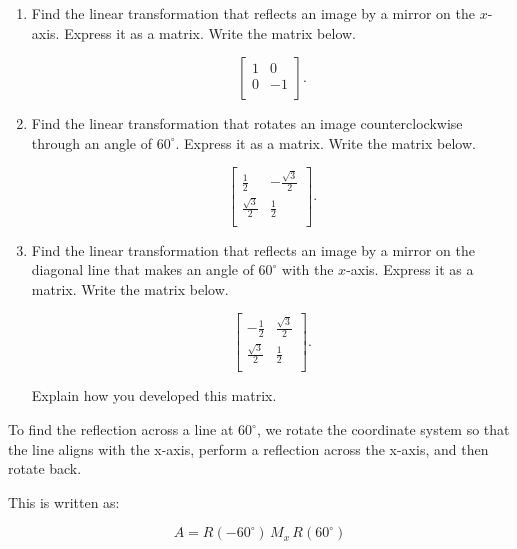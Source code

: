 \documentclass{ximera}
\begin{document}
\begin{enumerate}
    \item Find the linear transformation that reflects an image by a mirror on the $x$-axis.  Express it as a matrix.  Write the matrix below.

$$\left[{\begin{array}{cc}
1 & 0 \\
0 & -1 \\
\end{array}}\right].$$


\vspace{.5in}



\item Find the linear transformation that rotates an image counterclockwise through an angle of $60^{\circ}$.  Express it as a matrix.  Write the matrix below.

$$\left[{\begin{array}{cc}
\frac{1}{2} & -\frac{\sqrt{3}}{2} \\
\frac{\sqrt{3}}{2} & \frac{1}{2} \\
\end{array}}\right].$$

\vspace{.5in}


\item Find the linear transformation that reflects an image by a mirror on the diagonal line that makes an angle of $60^{\circ}$ with the $x$-axis.  Express it as a matrix.  Write the matrix below.

$$\left[{\begin{array}{cc}
-\frac{1}{2} & \frac{\sqrt{3}}{2} \\
\frac{\sqrt{3}}{2} & \frac{1}{2} \\
\end{array}}\right].$$

\vspace{8pt}


\noindent Explain how you developed this matrix.


\end{enumerate}
\noindent To find the reflection across a line at $60^\circ$, we rotate the coordinate system so that the line aligns with the x-axis, perform a reflection across the x-axis, and then rotate back.


This is written as:

\[
A = R(-60^\circ)\, M_x \, R(60^\circ)
\]
\end{document}
